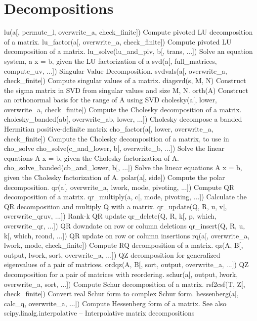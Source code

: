 \newpage
\section{Decompositions}

lu(a[, permute_l, overwrite_a, check_finite])	Compute pivoted LU decomposition of a matrix.
lu_factor(a[, overwrite_a, check_finite])	Compute pivoted LU decomposition of a matrix.
lu_solve(lu_and_piv, b[, trans, ...])	Solve an equation system, a x = b, given the LU factorization of a
svd(a[, full_matrices, compute_uv, ...])	Singular Value Decomposition.
svdvals(a[, overwrite_a, check_finite])	Compute singular values of a matrix.
diagsvd(s, M, N)	Construct the sigma matrix in SVD from singular values and size M, N.
orth(A)	Construct an orthonormal basis for the range of A using SVD
cholesky(a[, lower, overwrite_a, check_finite])	Compute the Cholesky decomposition of a matrix.
cholesky_banded(ab[, overwrite_ab, lower, ...])	Cholesky decompose a banded Hermitian positive-definite matrix
cho_factor(a[, lower, overwrite_a, check_finite])	Compute the Cholesky decomposition of a matrix, to use in cho_solve
cho_solve(c_and_lower, b[, overwrite_b, ...])	Solve the linear equations A x = b, given the Cholesky factorization of A.
cho_solve_banded(cb_and_lower, b[, ...])	Solve the linear equations A x = b, given the Cholesky factorization of A.
polar(a[, side])	Compute the polar decomposition.
qr(a[, overwrite_a, lwork, mode, pivoting, ...])	Compute QR decomposition of a matrix.
qr_multiply(a, c[, mode, pivoting, ...])	Calculate the QR decomposition and multiply Q with a matrix.
qr_update(Q, R, u, v[, overwrite_qruv, ...])	Rank-k QR update
qr_delete(Q, R, k[, p, which, overwrite_qr, ...])	QR downdate on row or column deletions
qr_insert(Q, R, u, k[, which, rcond, ...])	QR update on row or column insertions
rq(a[, overwrite_a, lwork, mode, check_finite])	Compute RQ decomposition of a matrix.
qz(A, B[, output, lwork, sort, overwrite_a, ...])	QZ decomposition for generalized eigenvalues of a pair of matrices.
ordqz(A, B[, sort, output, overwrite_a, ...])	QZ decomposition for a pair of matrices with reordering.
schur(a[, output, lwork, overwrite_a, sort, ...])	Compute Schur decomposition of a matrix.
rsf2csf(T, Z[, check_finite])	Convert real Schur form to complex Schur form.
hessenberg(a[, calc_q, overwrite_a, ...])	Compute Hessenberg form of a matrix.
See also
scipy.linalg.interpolative – Interpolative matrix decompositions

\newpage 
